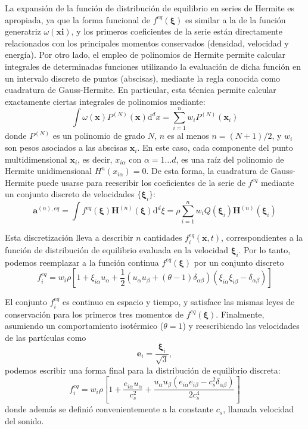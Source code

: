 La expansi\'on de la funci\'on de distribuci\'on de equilibrio \feqvar{} en series de Hermite es apropiada, ya que la forma funcional de $f^{eq}(\bm{\xi})$ es similar a la de la funci\'on generatriz $\omega(\bm{xi})$, y los primeros coeficientes de la serie est\'an directamente relacionados con los principales momentos conservados (densidad, velocidad y energ\'ia). Por otro lado, el empleo de polinomios de Hermite permite calcular integrales de determinadas funciones utilizando la evaluaci\'on de dicha funci\'on en un intervalo discreto de puntos (abscisas), mediante la regla conocida como cuadratura de Gauss-Hermite. En particular, esta t\'ecnica permite calcular exactamente ciertas integrales de polinomios mediante:
\begin{equation}
	\int \omega(\bm{x}) P^{(N)}(\bm{x})\mbox{d}^dx = \sum_{i=1}^{n} w_i P^{(N)}(\bm{x}_i)
\end{equation}
donde $P^{(N)}$ es un polinomio de grado $N$, $n$ es al menos $n=(N+1)/2$, y $w_i$ son pesos asociados a las abscisas $\bm{x}_i$. En este caso, cada componente del punto multidimensional $\bm{x}_i$, es decir, $x_{i\alpha}$ con $\alpha=1\ldots d$, es una ra\'iz del polinomio de Hermite unidimensional $H^{n}(x_{i\alpha})=0$. De esta forma, la cuadratura de Gauss-Hermite puede usarse para reescribir los coeficientes de la serie de $f^{eq}$ mediante un conjunto discreto de velocidades $\{ \bm{\xi}_i \}$:
\begin{equation}
	\bm{a}^{(n),eq} = \int f^{eq}(\bm{\xi}) \bm{H}^{(n)}(\bm{\xi}) \mbox{d}^d \xi 
	= \rho \sum_{i=1}^n w_i Q(\bm{\xi}_i)\bm{H}^{(n)}(\bm{\xi}_i)
\end{equation}

Esta discretizaci\'on lleva a describir $n$ cantidades $f_i^{eq}(\bm{x},t)$, correspondientes a la funci\'on de distribuci\'on de equilibrio evaluada en la velocidad $\bm{\xi}_i$. Por lo tanto, podemos reemplazar a la funci\'on continua $f^{eq}(\bm{\xi})$ por un conjunto discreto
\begin{equation}
	f_i^{eq} = w_i \rho \left[ 1 + \xi_{i\alpha}u_{\alpha} + \dfrac{1}{2}\left( u_{\alpha}u_{\beta}+(\theta-1)\delta_{\alpha\beta} \right)\left(\xi_{i\alpha}\xi_{i\beta} - \delta_{\alpha\beta}\right) \right]
\end{equation}
\par
El conjunto ${f_i^{eq}}$ es continuo en espacio y tiempo, y satisface las mismas leyes de conservaci\'on para los primeros tres momentos de $f^{eq}(\bm{\xi})$. Finalmente, asumiendo un comportamiento isot\'ermico ($\theta = 1$) y reescribiendo las velocidades de las part\'iculas como
\begin{equation}
	\bm{e}_i = \dfrac{\bm{\xi}_i}{\sqrt{3}},
\end{equation}
podemos escribir una forma final para la distribuci\'on de equilibrio discreta:
\begin{equation}
	f_i^{eq} = w_i \rho \left[ 1 + \dfrac{e_{i\alpha}u_{\alpha}}{c_s^2} + \dfrac{u_{\alpha}u_{\beta}(e_{i\alpha}e_{i\beta}-c_s^2\delta_{\alpha\beta})}{2c_s^4} \right]
\end{equation}
donde adem\'as se defini\'o convenientemente a la constante $c_s$, llamada velocidad del sonido.


